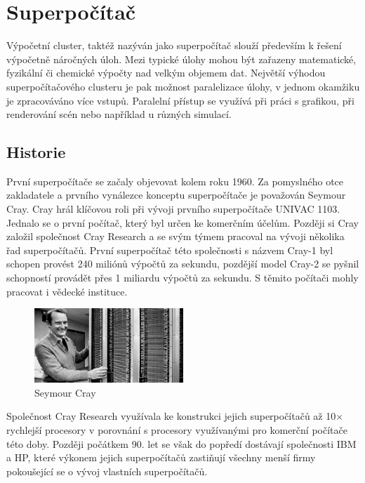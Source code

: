 \chapter{Superpočítač}
Výpočetní cluster, taktéž nazýván jako superpočítač slouží především k řešení výpočetně náročných úloh. Mezi typické úlohy mohou být zařazeny matematické, fyzikální či chemické výpočty nad velkým objemem dat. Největší výhodou superpočítačového clusteru je pak možnost paralelizace úlohy, v jednom okamžiku je zpracováváno více vstupů. Paralelní přístup se využívá při práci s grafikou, při renderování scén nebo například u různých simulací.

\section{Historie}
První superpočítače se začaly objevovat kolem roku 1960. Za pomyslného otce zakladatele a prvního vynálezce konceptu superpočítače je považován Seymour Cray. Cray hrál klíčovou roli při vývoji prvního superpočítače UNIVAC 1103. Jednalo se o první počítač, který byl určen ke komerčním účelům. Později si Cray založil společnost Cray Research a se svým týmem pracoval na vývoji několika řad superpočítačů. První superpočítač této společnosti s názvem Cray-1 byl schopen provést 240 miliónů výpočtů za sekundu, pozdější model Cray-2 se pyšnil schopností provádět přes 1 miliardu výpočtů za sekundu. S těmito počítači mohly pracovat i vědecké instituce.\cite{E1JpczXW0qh9e98N}

\begin{figure}
	\centering
	\includegraphics[width=0.5\textwidth]{Figures/seymour-cray.jpg}
	\caption{Seymour Cray \cite{Tronner20150626}}
	\label{fig:seymour-cray}
\end{figure}

Společnost Cray Research využívala ke konstrukci jejich superpočítačů až 10× rychlejší procesory v porovnání s procesory využívanými pro komerční počítače této doby. Později počátkem 90. let se však do popředí dostávají společnosti IBM a HP, které výkonem jejich superpočítačů zastiňují všechny menší firmy pokoušející se o vývoj vlastních superpočítačů.

